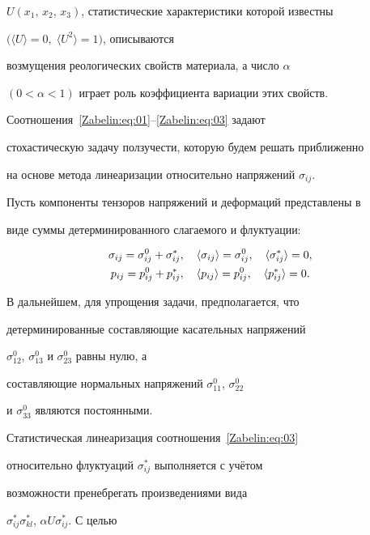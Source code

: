 $U(x_1,\, x_2,\, x_3)$, статистические характеристики которой известны

$\big(\langle U\rangle=0,\;\langle U^2\rangle=1\big)$, описываются

возмущения реологических свойств материала, а число $\alpha$

$(0<\alpha<1)$ играет роль коэффициента вариации этих свойств.



Соотношения~\eqref{Zabelin:eq:01}--\eqref{Zabelin:eq:03} задают

стохастическую задачу ползучести, которую будем решать приближенно

на основе метода линеаризации относительно напряжений $\sigma_{ij}$.



Пусть компоненты тензоров напряжений и деформаций представлены в

виде суммы детерминированного слагаемого и флуктуации:

\begin{gather}

\sigma_{ij}=\sigma_{ij}^0+\sigma_{ij}^*,\quad\langle\sigma_{ij}\rangle=\sigma_{ij}^0,\quad\langle\sigma_{ij}^*\rangle=0,\notag\\

p_{ij}=p_{ij}^0+p_{ij}^*,\quad\langle

p_{ij}\rangle=p_{ij}^0,\quad\langle

p_{ij}^*\rangle=0.\label{Zabelin:eq:04}

\end{gather}



В дальнейшем, для упрощения задачи, предполагается, что

детерминированные составляющие касательных напряжений

$\sigma_{12}^0$, $\sigma_{13}^0$ и $\sigma_{23}^0$ равны нулю, а

составляющие нормальных напряжений $\sigma_{11}^0$, $\sigma_{22}^0$

и $\sigma_{33}^0$ являются постоянными.



Статистическая линеаризация соотношения~\eqref{Zabelin:eq:03}

относительно флуктуаций $\sigma_{ij}^*$ выполняется с учётом

возможности пренебрегать произведениями вида

$\sigma_{ij}^*\sigma_{kl}^*$, $\alpha U\sigma_{ij}^*$. С целью

